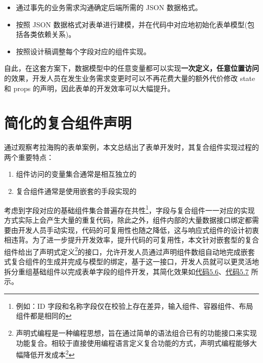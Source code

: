 \documentclass[winfonts,master,twoside]{njuthesis}
\begin{document}
\begin{itemize}
    \item 通过事先的业务需求沟通确定后端所需的 JSON 数据格式。
    \item 按照 JSON 数据格式对表单进行建模，并在代码中对应地初始化表单模型(包括各类依赖关系)。
    \item 按照设计稿调整每个字段对应的组件实现。
\end{itemize}

自此，在这套方案下，数据模型中的任意变量都可以实现\textbf{一次定义，任意位置访问}的效果，开发人员在发生业务需求变更时可以不再花费大量的额外代价修改 state 和 props 的声明，因此表单的开发效率可以大幅提升。

\section{简化的复合组件声明}

通过观察考拉海购的表单案例，本文总结出了表单开发时，其复合组件实现过程的两个重要特点：

\begin{enumerate}
    \item 组件访问的变量集合通常是相互独立的
    \item 复合组件通常是使用嵌套的手段实现的
\end{enumerate}

考虑到字段对应的基础组件集合普遍存在共性\footnote{例如：ID 字段和名称字段仅在校验上存在差异，输入组件、容器组件、布局组件都是相同的}，字段与复合组件一一对应的实现方式实际上会产生大量的重复代码，除此之外，组件内部的大量数据接口绑定都需要由开发人员手动实现，代码的可复用性也随之降低，这与响应式组件的设计初衷相违背。为了进一步提升开发效率，提升代码的可复用性，本文针对嵌套型的复合组件给出了声明式定义\footnote{声明式编程是一种编程思想，旨在通过简单的语法组合已有的功能接口来实现功能复合。相较于直接使用编程语言定义复合功能的方式，声明式编程能够大幅降低开发成本\footnote{antoy2005declarative}}的接口，允许开发人员通过声明组件数组自动地完成嵌套式复合组件的生成并完成与模型的绑定，基于这一接口，开发人员就可以更灵活地拆分重组基础组件以完成表单字段的组件开发，其简化效果如\hyperref[basic-nested-component]{代码5.6}、\hyperref[declarative-nested-component]{代码5.7} 所示。

\begin{center}
    \begin{minipage}{0.45\textwidth}
        
    \end{minipage}\quad
    \begin{minipage}{0.45\textwidth}
        
    \end{minipage}
\end{center}
\end{document}
